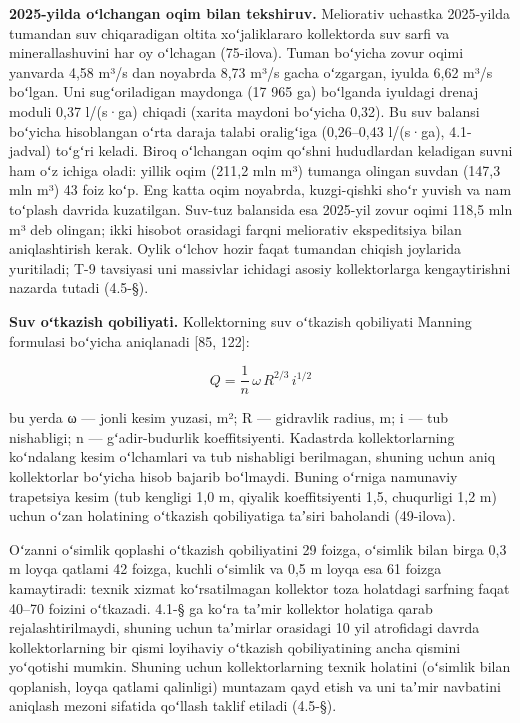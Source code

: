\documentclass[14pt,a4paper,oneside]{extreport}
\begin{document}
\textbf{2025-yilda oʻlchangan oqim bilan tekshiruv.} Meliorativ uchastka
2025-yilda tumandan suv chiqaradigan oltita xoʻjaliklararo kollektorda
suv sarfi va minerallashuvini har oy oʻlchagan (75-ilova). Tuman
boʻyicha zovur oqimi yanvarda 4,58 m³/s dan noyabrda 8,73 m³/s gacha
oʻzgargan, iyulda 6,62 m³/s boʻlgan. Uni sugʻoriladigan maydonga (17 965
ga) boʻlganda iyuldagi drenaj moduli 0,37 l/(s·ga) chiqadi (xarita
maydoni boʻyicha 0,32). Bu suv balansi boʻyicha hisoblangan oʻrta daraja
talabi oraligʻiga (0,26--0,43 l/(s·ga), 4.1-jadval) toʻgʻri keladi.
Biroq oʻlchangan oqim qoʻshni hududlardan keladigan suvni ham oʻz ichiga
oladi: yillik oqim (211,2 mln m³) tumanga olingan suvdan (147,3 mln m³)
43 foiz koʻp. Eng katta oqim noyabrda, kuzgi-qishki shoʻr yuvish va nam
toʻplash davrida kuzatilgan. Suv-tuz balansida esa 2025-yil zovur oqimi
118,5 mln m³ deb olingan; ikki hisobot orasidagi farqni meliorativ
ekspeditsiya bilan aniqlashtirish kerak. Oylik oʻlchov hozir faqat
tumandan chiqish joylarida yuritiladi; T-9 tavsiyasi uni massivlar
ichidagi asosiy kollektorlarga kengaytirishni nazarda tutadi (4.5-§).

\textbf{Suv oʻtkazish qobiliyati.} Kollektorning suv oʻtkazish
qobiliyati Manning formulasi boʻyicha aniqlanadi {[}85, 122{]}:

\begin{equation}\tag{4.3}
Q = \frac{1}{n} \, \omega \, R^{2/3} \, i^{1/2}
\end{equation}

bu yerda ω --- jonli kesim yuzasi, m²; R --- gidravlik radius, m; i ---
tub nishabligi; n --- gʻadir-budurlik koeffitsiyenti. Kadastrda
kollektorlarning koʻndalang kesim oʻlchamlari va tub nishabligi
berilmagan, shuning uchun aniq kollektorlar boʻyicha hisob bajarib
boʻlmaydi. Buning oʻrniga namunaviy trapetsiya kesim (tub kengligi 1,0
m, qiyalik koeffitsiyenti 1,5, chuqurligi 1,2 m) uchun oʻzan holatining
oʻtkazish qobiliyatiga taʼsiri baholandi (49-ilova).

Oʻzanni oʻsimlik qoplashi oʻtkazish qobiliyatini 29 foizga, oʻsimlik
bilan birga 0,3 m loyqa qatlami 42 foizga, kuchli oʻsimlik va 0,5 m
loyqa esa 61 foizga kamaytiradi: texnik xizmat koʻrsatilmagan kollektor
toza holatdagi sarfning faqat 40--70 foizini oʻtkazadi. 4.1-§ ga koʻra
taʼmir kollektor holatiga qarab rejalashtirilmaydi, shuning uchun
taʼmirlar orasidagi 10 yil atrofidagi davrda kollektorlarning bir qismi
loyihaviy oʻtkazish qobiliyatining ancha qismini yoʻqotishi mumkin.
Shuning uchun kollektorlarning texnik holatini (oʻsimlik bilan
qoplanish, loyqa qatlami qalinligi) muntazam qayd etish va uni taʼmir
navbatini aniqlash mezoni sifatida qoʻllash taklif etiladi (4.5-§).
\end{document}
